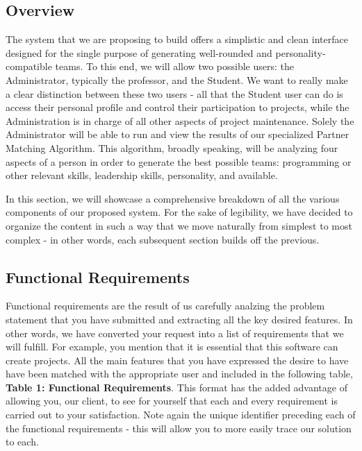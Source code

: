 \documentclass[12pt,letterpaper]{article}
\begin{document}
\subsection{Overview}

The system that we are proposing to build offers a simplistic and clean interface designed for the single purpose of generating 
well-rounded and personality-compatible teams. To this end, we will allow two possible users: the Administrator, typically the professor,
and the Student. We want to really make a clear distinction between these two users - all that the Student user can do is access their
personal profile and control their participation to projects, while the Administration is in charge of all other aspects of project maintenance. 
Solely the Administrator will be able to run and view the results of our specialized Partner Matching Algorithm. This algorithm, broadly speaking,
will be analyzing four aspects of a person in order to generate the best possible teams:  programming or other relevant skills, leadership skills,
personality, and available. 

In this section, we will showcase a comprehensive breakdown of all the various components of our proposed system. For the sake of 
legibility, we have decided to organize the content in such a way that we move naturally from simplest to most complex - in other words,
each subsequent section builds off the previous. 

\subsection{Functional Requirements}

Functional requirements are the result of us carefully analzing the problem statement that you have submitted and extracting all the key 
desired features. In other words, we have converted your request into a list of requirements that we will fulfill. For example, you mention that
it is essential that this software can create projects. All the main features that you have expressed the desire to have have been matched with
the appropriate user and included in the following table, {\bf Table 1: Functional Requirements}. This format has the added advantage of allowing you, our client, to see for 
yourself that each and every requirement is carried out to your satisfaction. Note again the unique identifier preceding each of the functional 
requirements - this will allow you to more easily trace our solution to each. 
\end{document}
